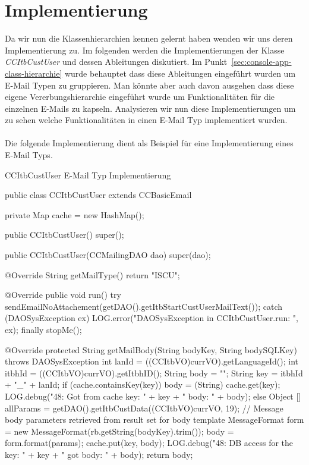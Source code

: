 \newpage
\section{Implementierung}
Da wir nun die Klassenhierarchien kennen gelernt haben wenden wir uns deren Implementierung zu. Im folgenden werden die Implementierungen der Klasse \emph{CCItbCustUser} und dessen Ableitungen diskutiert. Im Punkt~\ref{sec:console-app-class-hierarchie} wurde behauptet dass diese Ableitungen eingeführt wurden um E-Mail Typen zu gruppieren. Man könnte aber auch davon ausgehen dass diese eigene Vererbungshierarchie eingeführt wurde um Funktionalitäten für die einzelnen E-Mails zu kapseln. Analysieren wir nun diese Implementierungen um zu sehen welche Funktionalitäten in einen E-Mail Typ implementiert wurden. \\\\
Die folgende Implementierung dient als Beispiel für eine Implementierung eines E-Mail Typs.   

\begin{program}
\caption{CCItbCustUser E-Mail Typ Implementierung}
\label{CCItbCustUser.java}
\begin{JavaCode}
public class CCItbCustUser extends CCBasicEmail {
	
	private Map cache = new HashMap();

	public CCItbCustUser() {
		super();
	}

	public CCItbCustUser(CCMailingDAO dao) {
		super(dao);
	}

	@Override
	String getMailType() {
		return "ISCU";
	}
	
	@Override
	public void run() {
		try {
			sendEmailNoAttachement(getDAO().getItbStartCustUserMailText());
		} catch (DAOSysException ex) {
			LOG.error("DAOSysException in CCItbCustUser.run: ",
						ex);
		} finally {
			stopMe();
		}
	}
	
	@Override
	protected String getMailBody(String bodyKey, String bodySQLKey)
		throws DAOSysException {
		int lanId = ((CCItbVO)currVO).getLanguageId();
		int itbhId = ((CCItbVO)currVO).getItbhID();
		String body = "";
		String key = itbhId	+ "_" + lanId;
		if (cache.containsKey(key)) {
			body = (String) cache.get(key);
			LOG.debug("48: Got from cache key: " + key 
								+ " body: " + body);
		} else {
			Object [] allParams = getDAO().getItbCustData((CCItbVO)currVO, 19);
			// Message body parameters retrieved from result set for body template
			MessageFormat form = new MessageFormat(rb.getString(bodyKey).trim());
	 		body = form.format(params);
	 		cache.put(key, body);
	 		LOG.debug("48: DB access for the key: " + key
	 						+ " got body: " + body);
		}
		return body;
	}
}
\end{JavaCode}
\end{program}

